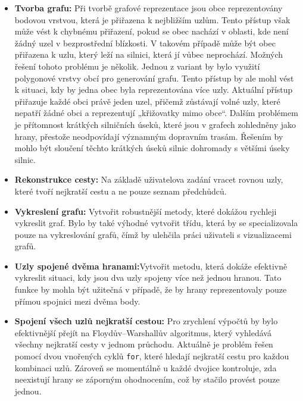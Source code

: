 \begin{itemize} 
    \item \textbf{Tvorba grafu:} Při tvorbě grafové reprezentace jsou obce reprezentovány bodovou vrstvou, která je přiřazena k nejbližším uzlům. Tento přístup však může vést k chybnému přiřazení, pokud se obec nachází v oblasti, kde není žádný uzel v bezprostřední blízkosti. V takovém případě může být obec přiřazena k uzlu, který leží na silnici, která jí vůbec neprochází. Možných řešení tohoto problému je několik. Jednou z variant by bylo využití polygonové vrstvy obcí pro generování grafu. Tento přístup by ale mohl vést k situaci, kdy by jedna obec byla reprezentována více uzly. Aktuální přístup přiřazuje každé obci právě jeden uzel, přičemž zůstávají volné uzly, které nepatří žádné obci a reprezentují „křižovatky mimo obce“. Dalším problémem je přítomnost krátkých silničních úseků, které jsou v grafech zohledněny jako hrany, přestože neodpovídají významným dopravním trasám. Řešením by mohlo být sloučení těchto krátkých úseků silnic dohromady s většími úseky silnic.

    \item \textbf{Rekonstrukce cesty:} Na základě uživatelova zadání vracet rovnou uzly, které tvoří nejkratší cestu a ne pouze seznam předchůdců.
    
    \item \textbf{Vykreslení grafu:} Vytvořit robustnější metody, které dokážou rychleji vykreslit graf. Bylo by také výhodné vytvořit třídu, která by se specializovala pouze na vykreslování grafů, čímž by ulehčila práci uživateli s vizualizacemi grafů.

    \item \textbf{Uzly spojené dvěma hranami:}Vytvořit metodu, která dokáže efektivně vykreslit situaci, kdy jsou dva uzly spojeny více než jednou hranou. Tato funkce by mohla být užitečná v případě, že by hrany reprezentovaly pouze přímou spojnici mezi dvěma body.
    
    \item \textbf{Spojení všech uzlů nejkratší cestou:} Pro zrychlení výpočtů by bylo efektivnější přejít na Floydův–Warshallův algoritmus, který vyhledává všechny nejkratší cesty v jednom průchodu. Aktuálně je problém řešen pomocí dvou vnořených cyklů \texttt{for}, které hledají nejkratší cestu pro každou kombinaci uzlů. Zároveň se momentálně u každé dvojice kontroluje, zda neexistují hrany se záporným ohodnocením, což by stačilo provést pouze jednou.
\end{itemize}